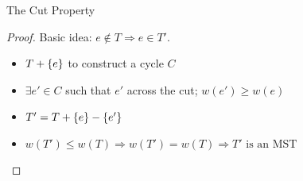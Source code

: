 \begin{frame}{The Cut Property}

  \begin{proof}
    Basic idea: $e \notin T \Rightarrow e \in T'$.
	\begin{itemize}
	  \item $T + \{e\}$ to construct a cycle $C$
	  \item $\exists e'\in C$ such that $e'$ across the cut; $w(e')
	  \geq w(e)$
	  \item $T' = T + \{e\} - \{e'\}$
	  \item $w(T') \le w(T) \Rightarrow w(T') = w(T) \Rightarrow T' \textrm{ is
	  an MST}$
	\end{itemize}
  \end{proof}
\end{frame}
